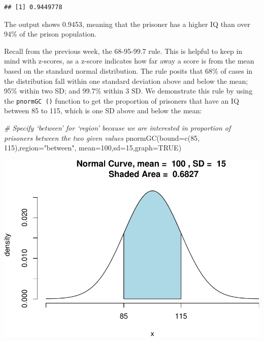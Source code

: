 \documentclass[
]{book}
\newenvironment{Shaded}{\begin{snugshade}}{\end{snugshade}}
\newcommand{\AttributeTok}[1]{\textcolor[rgb]{0.77,0.63,0.00}{#1}}
\newcommand{\CommentTok}[1]{\textcolor[rgb]{0.56,0.35,0.01}{\textit{#1}}}
\newcommand{\ConstantTok}[1]{\textcolor[rgb]{0.00,0.00,0.00}{#1}}
\newcommand{\DecValTok}[1]{\textcolor[rgb]{0.00,0.00,0.81}{#1}}
\newcommand{\FunctionTok}[1]{\textcolor[rgb]{0.00,0.00,0.00}{#1}}
\newcommand{\NormalTok}[1]{#1}
\newcommand{\StringTok}[1]{\textcolor[rgb]{0.31,0.60,0.02}{#1}}
\begin{document}
\begin{verbatim}
## [1] 0.9449778
\end{verbatim}

The output shows 0.9453, meaning that the prisoner has a higher IQ than over 94\% of the prison population.

Recall from the previous week, the 68-95-99.7 rule. This is helpful to keep in mind with z-scores, as a z-score indicates how far away a score is from the mean based on the standard normal distribution. The rule posits that 68\% of cases in the distribution fall within one standard deviation above and below the mean; 95\% within two SD; and 99.7\% within 3 SD. We demonstrate this rule by using the \texttt{pnormGC\ ()} function to get the proportion of prisoners that have an IQ between 85 to 115, which is one SD above and below the mean:

\begin{Shaded}
\begin{Highlighting}[]
\CommentTok{\# Specify ‘between’ for ‘region’ because we are interested in proportion of prisoners between the two given values}
\FunctionTok{pnormGC}\NormalTok{(}\AttributeTok{bound=}\FunctionTok{c}\NormalTok{(}\DecValTok{85}\NormalTok{, }\DecValTok{115}\NormalTok{),}\AttributeTok{region=}\StringTok{"between"}\NormalTok{, }\AttributeTok{mean=}\DecValTok{100}\NormalTok{,}\AttributeTok{sd=}\DecValTok{15}\NormalTok{,}\AttributeTok{graph=}\ConstantTok{TRUE}\NormalTok{)}
\end{Highlighting}
\end{Shaded}

\includegraphics{06-hypotheses_files/figure-latex/unnamed-chunk-11-1.pdf}
\end{document}
